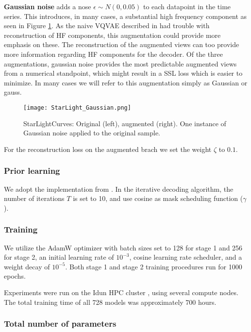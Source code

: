 \documentclass[../../thesis.tex]{subfiles}
\begin{document}
\textbf{Gaussian noise} adds a nose $\epsilon \sim N(0,0.05)$ to each datapoint in the time series. This introduces, in many cases, a substantial high frequency component as seen in Figure \ref{fig:StarLight_Gaussian}. As the naive VQVAE described in \cite{TimeVQVAE} had trouble with reconstruction of HF components, this augmentation could provide more emphasis on these. The reconstruction of the augmented views can too provide more information regarding HF components for the decoder. Of the three augmentations, gaussian noise provides the most predictable augmented views from a numerical standpoint, which might result in a SSL loss which is easier to minimize. In many cases we will refer to this augmentation simply as Gaussian or gauss.
\begin{figure}[h]
    \texttt{[image: StarLight\_Gaussian.png]}
    \centering
    \caption{StarLightCurves: Original (left), augmented (right). One instance of Gaussian noise applied to the original sample.}
    \label{fig:StarLight_Gaussian}
\end{figure}

For the reconstruction loss on the augmented brach we set the weight $\zeta$ to $0.1$.  

\subsubsection{Prior learning}
We adopt the implementation from \cite{chang2022maskgit}. In the iterative decoding algorithm, the number of iterations $T$ is set to 10, and use cosine as mask scheduling function ($\gamma$). 

\subsubsection{Training}
We utilize the AdamW optimizer with batch sizes set to 128 for stage 1 and 256 for stage 2, an initial learning rate of $10^{-3}$, cosine learning rate scheduler, and a weight decay of $10^{-5}$. Both stage 1 and stage 2 training procedures run for 1000 epochs.\newline

Experiments were run on the Idun HPC cluster \cite{Idun}, using several compute nodes. The total training time of all 728 models was approximately 700 hours. 


\subsubsection{Total number of parameters}
\end{document}

